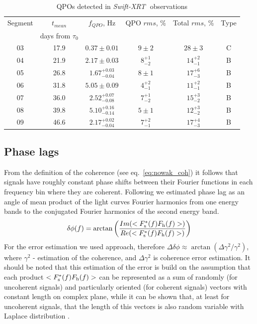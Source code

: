 \documentclass[a4paper,fleqn,usenatbib]{mnras}
\def\swiftx{{\em Swift-XRT\,}}
\begin{document}
\begin{table}
\noindent
\centering
\caption{QPOs detected in \swiftx\, observations}
\label{tab:xrtqpo}
\centering
\begin{tabular}{|c|c|c|c|c|c|}
\hline\hline
Segment &$t_{mean}$                   & $f_{QPO}$, Hz & QPO $rms$, \% & Total $rms$, \% & Type\\
                &   days from $\tau_{0}$     &                           &                           &                            &\\
\hline
03  &17.9&  $0.37\pm0.01$            & $9\pm2$       & $28\pm3$        & C\\
04  &21.9&  $2.17\pm0.03$            & $8_{-2}^{+1}$ & $14_{-1}^{+2}$  & B\\
05  &26.8&  $1.67_{-0.04}^{+0.03}$   & $8\pm1$       & $17_{-3}^{+6}$  & B\\ 
06  &31.8&  $5.05\pm0.09$            & $4_{-1}^{+2}$ & $11_{-1}^{+2}$  & B\\
07  &36.0&  $2.52_{-0.08}^{+0.07}$   & $7_{-2}^{+1}$ & $15_{-2}^{+3}$  & B\\ 
08  &39.8&  $5.10_{-0.14}^{+0.16}$   & $5\pm1$       & $12_{-2}^{+3}$  & B\\
09  &46.6&  $2.17_{-0.04}^{+0.02}$   & $7_{-1}^{+2}$ & $17_{-3}^{+4}$  & B\\
\hline
\end{tabular}
\end{table}

\subsection{Phase lags}
        From the definition of the coherence (see eq.~\ref{eq:nowak_coh}) it follows that signals have roughly constant phase shifts between their Fourier functions in each frequency bin where they are coherent. 
Following \citet{1997ApJ...474L..43V} we estimated phase lag as an angle of mean product of the light curves Fourier harmonics from one energy bands to the conjugated Fourier harmonics of the second energy band. 
\begin{equation}
      \delta \phi(f) = \arctan{\left(\frac{Im(<F_{\rm s}^{*}(f) F_{\rm h}(f)>)}{Re(<F_{\rm s}^{*}(f) F_{\rm h}(f)>)}\right)}
\end{equation}
For the error estimation we used \citet{2014A&ARv..22...72U} approach, therefore $\Delta\delta\phi \approx \arctan{(\Delta\gamma^2/\gamma^2)}$, where $\gamma^2$ - estimation of the coherence, and $\Delta\gamma^2$ is coherence error estimation.
It should be noted that this estimation of the error is build on the assumption that each product $<F_{\rm s}^{*}(f) F_{\rm h}(f)>$ can be represented as a sum of randomly (for uncoherent signals) and particularly oriented (for coherent signals) vectors with constant length on complex plane, while it can be shown that, at least for uncoherent signals, that the length of this vectors is also random variable with Laplace distribution \citep{2017arXiv170909666H}.
\end{document}
